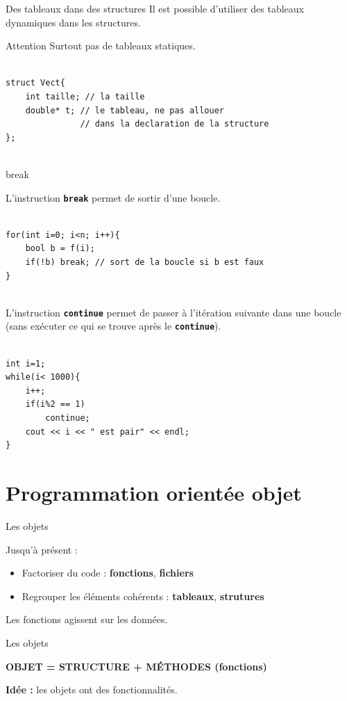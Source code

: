 \begin{frame}[fragile=singleslide]{Des tableaux dans des structures}
    Il est possible d'utiliser des tableaux dynamiques dans les structures.
    \begin{alertblock}{Attention}
        Surtout pas de tableaux statiques.
    \end{alertblock}
    \begin{verbatim}
        
struct Vect{
    int taille; // la taille
    double* t; // le tableau, ne pas allouer
               // dans la declaration de la structure
};
        
    \end{verbatim}
\end{frame}

\begin{frame}[fragile=singleslide]{break}

    L'instruction \textbf{\texttt{break}} permet de sortir d'une boucle.
    \vspace{-0.1cm}
    \begin{verbatim}
        
for(int i=0; i<n; i++){
    bool b = f(i);
    if(!b) break; // sort de la boucle si b est faux
}
        
    \end{verbatim}
L'instruction \texttt{\textbf{continue}} permet de passer à l'itération suivante dans une boucle (sans exécuter ce qui se trouve après le \texttt{\textbf{continue}}).

\begin{verbatim}
    
int i=1;
while(i< 1000){
    i++;
    if(i%2 == 1)
        continue;
    cout << i << " est pair" << endl;
}
\end{verbatim}

\end{frame}

\section{Programmation orientée objet}

\begin{frame}{Les objets}
    \begin{block}{Jusqu'à présent :}
        \begin{itemize}
            \item Factoriser du code : \textbf{fonctions}, \textbf{fichiers}
            \item Regrouper les éléments cohérents : \textbf{tableaux}, \textbf{strutures}
        \end{itemize}
        Les fonctions agissent sur les données.
    \end{block}

    \begin{block}{Les objets}
        \begin{center}
            \textbf{OBJET = STRUCTURE + MÉTHODES (fonctions)}
        \end{center}
        \textbf{Idée :} les objets ont des fonctionnalités.
    \end{block}
\end{frame}

